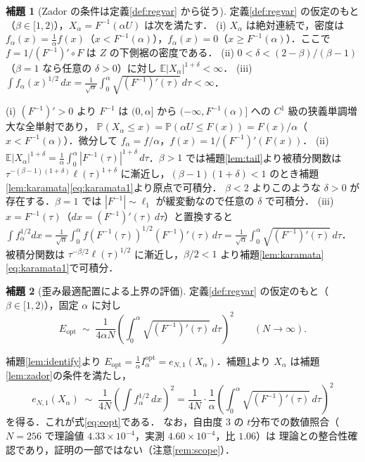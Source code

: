 \documentclass[a4paper,10pt]{jsarticle}
\makeatletter
\theoremstyle{definition}
\newtheorem{lemma}{補題}[section]
\renewenvironment{proof}[1][\proofname]{\par
  \pushQED{\qed}%
  \normalfont \topsep6\p@\@plus6\p@\relax
  \trivlist
  \item[\hskip\labelsep\textbf{#1}]\ignorespaces
}{%
  \popQED\endtrivlist\@endpefalse
}
\renewcommand{\proofname}{証明}
\newcommand{\Finv}{F^{-1}}
\newcommand{\E}{\mathbb{E}}
\newcommand{\Prob}{\mathbb{P}}
\newcommand{\eN}{e_{N,1}}
\newcommand{\Eopt}{E_{\mathrm{opt}}}
\newcommand{\Iopt}{I_\alpha^{\mathrm{opt}}}
\makeatother
\begin{document}
\begin{lemma}[Zador の条件は定義\ref{def:regvar} から従う]
\label{lem:zador-cond}
定義\ref{def:regvar} の仮定のもと（$\beta\in[1,2)$），$X_\alpha=\Finv(\alpha U)$ は次を満たす．
(i) $X_\alpha$ は絶対連続で，密度は $f_\alpha(x)=\frac1\alpha f(x)$（$x<\Finv(\alpha)$），$f_\alpha(x)=0$（$x\ge\Finv(\alpha)$）．ここで $f=1/(\Finv)'\circ F$ は $Z$ の下側裾の密度である．
(ii) $0<\delta<(2-\beta)/(\beta-1)$（$\beta=1$ なら任意の $\delta>0$）に対し $\E|X_\alpha|^{1+\delta}<\infty$．
(iii) $\displaystyle\int f_\alpha(x)^{1/2}\,dx=\frac1{\sqrt\alpha}\int_0^\alpha\sqrt{(\Finv)'(\tau)}\,d\tau<\infty$．
\end{lemma}
\begin{proof}
(i) $(\Finv)'>0$ より $\Finv$ は $(0,\alpha]$ から $(-\infty,\Finv(\alpha)]$ への $C^1$ 級の狭義単調増大な全単射であり，
$\Prob(X_\alpha\le x)=\Prob(\alpha U\le F(x))=F(x)/\alpha$（$x<\Finv(\alpha)$）．微分して $f_\alpha=f/\alpha$，$f(x)=1/(\Finv)'(F(x))$．
(ii) $\E|X_\alpha|^{1+\delta}=\frac1\alpha\int_0^\alpha|\Finv(\tau)|^{1+\delta}\,d\tau$．$\beta>1$ では補題\ref{lem:tail}より被積分関数は
$\tau^{-(\beta-1)(1+\delta)}\ell(\tau)^{1+\delta}$ に漸近し，$(\beta-1)(1+\delta)<1$ のとき補題\ref{lem:karamata}\eqref{eq:karamata1}より原点で可積分．
$\beta<2$ よりこのような $\delta>0$ が存在する．$\beta=1$ では $|\Finv|\sim\ell_1$ が緩変動なので任意の $\delta$ で可積分．
(iii) $x=\Finv(\tau)$（$dx=(\Finv)'(\tau)\,d\tau$）と置換すると
$\int f_\alpha^{1/2}dx=\frac1{\sqrt\alpha}\int_0^\alpha f(\Finv(\tau))^{1/2}(\Finv)'(\tau)\,d\tau=\frac1{\sqrt\alpha}\int_0^\alpha\sqrt{(\Finv)'(\tau)}\,d\tau$．
被積分関数は $\tau^{-\beta/2}\ell(\tau)^{1/2}$ に漸近し，$\beta/2<1$ より補題\ref{lem:karamata}\eqref{eq:karamata1}で可積分．
\end{proof}

\begin{lemma}[歪み最適配置による上界の評価]
\label{lem:opt}
定義\ref{def:regvar} の仮定のもと（$\beta\in[1,2)$），固定 $\alpha$ に対し
\begin{equation}
  \Eopt\;\sim\;\frac1{4\alpha N}\left(\int_0^\alpha\sqrt{(\Finv)'(\tau)}\,d\tau\right)^{2}
  \qquad(N\to\infty).
  \label{eq:eopt}
\end{equation}
\end{lemma}
\begin{proof}
補題\ref{lem:identify}より $\Eopt=\frac1\alpha\Iopt=\eN(X_\alpha)$．補題\ref{lem:zador-cond}より $X_\alpha$ は補題\ref{lem:zador}の条件を満たし，
\begin{equation*}
\eN(X_\alpha)\;\sim\;\frac1{4N}\left(\int f_\alpha^{1/2}\,dx\right)^{2}
=\frac1{4N}\cdot\frac1\alpha\left(\int_0^\alpha\sqrt{(\Finv)'(\tau)}\,d\tau\right)^{2}
\end{equation*}
を得る．これが式\eqref{eq:eopt}である．
なお，自由度 $3$ の $t$分布での数値照合（$N=256$ で理論値 $4.33\times10^{-4}$，実測 $4.60\times10^{-4}$，比 $1.06$）は
理論との整合性確認であり，証明の一部ではない（注意\ref{rem:scope}）．
\end{proof}
\end{document}
